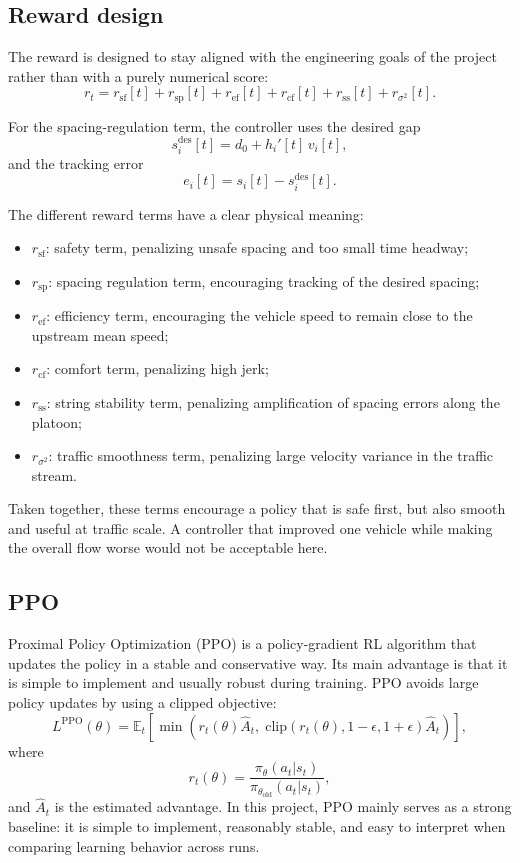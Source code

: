 \subsection{Reward design}

The reward is designed to stay aligned with the engineering goals of the project rather than with a purely numerical score:
\[
r_t = r_{\mathrm{sf}}[t] + r_{\mathrm{sp}}[t] + r_{\mathrm{ef}}[t] + r_{\mathrm{cf}}[t] + r_{\mathrm{ss}}[t] + r_{\sigma^2}[t].
\]

For the spacing-regulation term, the controller uses the desired gap
\[
s_i^{\mathrm{des}}[t] = d_0 + h_i'[t]\,v_i[t],
\]
and the tracking error
\[
e_i[t] = s_i[t] - s_i^{\mathrm{des}}[t].
\]

The different reward terms have a clear physical meaning:
\begin{itemize}
    \item $r_{\mathrm{sf}}$: safety term, penalizing unsafe spacing and too small time headway;
    \item $r_{\mathrm{sp}}$: spacing regulation term, encouraging tracking of the desired spacing;
    \item $r_{\mathrm{ef}}$: efficiency term, encouraging the vehicle speed to remain close to the upstream mean speed;
    \item $r_{\mathrm{cf}}$: comfort term, penalizing high jerk;
    \item $r_{\mathrm{ss}}$: string stability term, penalizing amplification of spacing errors along the platoon;
    \item $r_{\sigma^2}$: traffic smoothness term, penalizing large velocity variance in the traffic stream.
\end{itemize}

Taken together, these terms encourage a policy that is safe first, but also smooth and useful at traffic scale. A controller that improved one vehicle while making the overall flow worse would not be acceptable here.

\subsection{PPO}

Proximal Policy Optimization (PPO) is a policy-gradient RL algorithm that updates the policy in a stable and conservative way. Its main advantage is that it is simple to implement and usually robust during training. PPO avoids large policy updates by using a clipped objective:
\[
L^{\mathrm{PPO}}(\theta)
=
\mathbb{E}_t
\left[
\min\left(
r_t(\theta)\hat{A}_t,\;
\mathrm{clip}(r_t(\theta),1-\epsilon,1+\epsilon)\hat{A}_t
\right)
\right],
\]
where
\[
r_t(\theta)=\frac{\pi_\theta(a_t|s_t)}{\pi_{\theta_{\mathrm{old}}}(a_t|s_t)},
\]
and $\hat{A}_t$ is the estimated advantage. In this project, PPO mainly serves as a strong baseline: it is simple to implement, reasonably stable, and easy to interpret when comparing learning behavior across runs.

